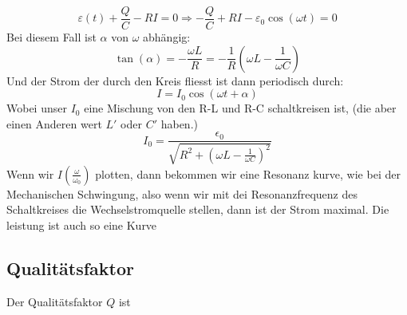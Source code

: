 \documentclass{article}
\begin{document}
\[\varepsilon(t)+\frac{Q}{C }-RI=0 \Longrightarrow -\frac{Q}{C }+R I-\varepsilon_0 \cos\left(\omega t\right)=0\]
Bei diesem Fall ist $\alpha$ von $\omega$ abhängig:
\[\tan(\alpha)=-\frac{\omega L }{R}=-\frac{1}{R }\left(\omega L-\frac{1}{\omega C}\right)\]
Und der Strom der durch den Kreis fliesst ist dann periodisch durch:
\[I=I_0 \cos\left(\omega t+\alpha\right)\]
Wobei unser $I_0$ eine Mischung von den R-L und R-C schaltkreisen ist, (die aber einen Anderen wert $L'$ oder $C'$ haben.)
\[I_0=\frac{\epsilon_0}{\sqrt{R^2+\left(\omega L-\frac{1}{\omega C }\right)^2}}\]
Wenn wir $I(\frac{\omega}{\omega_0})$ plotten, dann bekommen wir eine Resonanz kurve, wie bei der Mechanischen Schwingung, also wenn wir mit dei Resonanzfrequenz des Schaltkreises die Wechselstromquelle stellen, dann ist der Strom maximal. Die leistung ist auch so eine Kurve
\begin{figure}[h!]
\centering
{}
\end{figure}
\subsection*{Qualitätsfaktor}
Der Qualitätsfaktor $Q$ ist 
\end{document}
